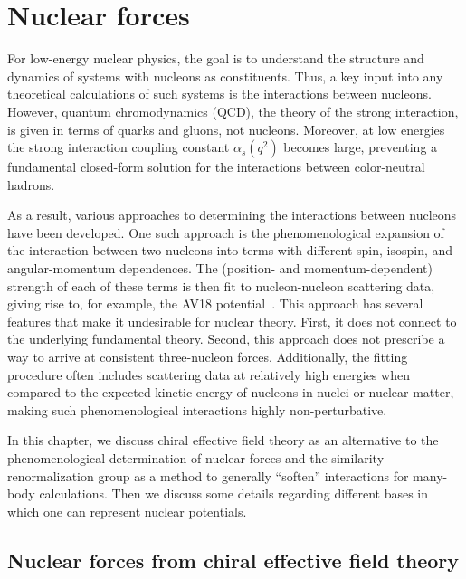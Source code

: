 \chapter{Nuclear forces}\label{ch:nuclear_forces}

For low-energy nuclear physics,
the goal is to understand the structure and dynamics of systems
with nucleons as constituents.
Thus, a key input into any theoretical calculations of such systems
is the interactions between nucleons.
However, quantum chromodynamics (QCD),
the theory of the strong interaction,
is given in terms of quarks and gluons, not nucleons.
Moreover, at low energies the strong interaction coupling constant $\alpha_s(q^2)$ becomes large,
preventing a fundamental closed-form solution for the interactions between color-neutral hadrons.

As a result, various approaches to determining the interactions between nucleons
have been developed.
One such approach is the phenomenological expansion of the interaction between two nucleons
into terms with different spin, isospin, and angular-momentum dependences.
The (position- and momentum-dependent) strength of each of these terms is then fit to nucleon-nucleon scattering data,
giving rise to, for example, the AV18 potential~\cite{Wiri95AV18}.
This approach has several features that make it undesirable for \abinitio{} nuclear theory.
First, it does not connect to the underlying fundamental theory.
Second, this approach does not prescribe a way to arrive at consistent three-nucleon forces.
Additionally, the fitting procedure often includes scattering data at relatively high energies
when compared to the expected kinetic energy of nucleons in nuclei or nuclear matter,
making such phenomenological interactions highly non-perturbative.

In this chapter, we discuss chiral effective field theory
as an alternative to the phenomenological determination of nuclear forces
and the similarity renormalization group as a method to generally ``soften'' interactions
for many-body calculations.
Then we discuss some details regarding different bases
in which one can represent nuclear potentials.

\section{Nuclear forces from chiral effective field theory}

